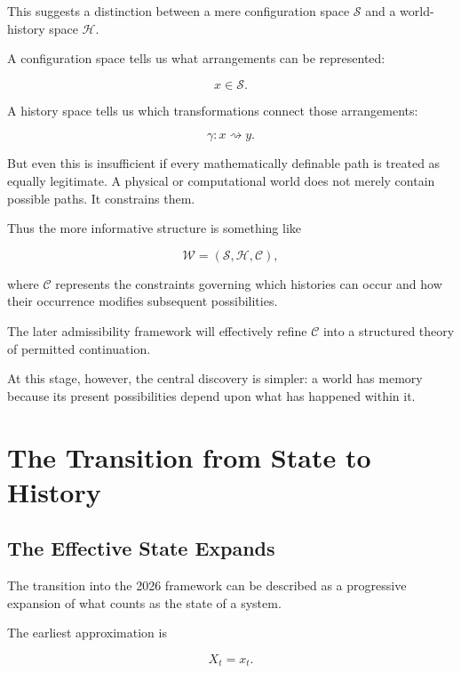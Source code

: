 \documentclass[11pt]{article}
\theoremstyle{remark}
\newcommand{\Hist}{\mathcal{H}}
\newcommand{\State}{\mathcal{S}}
\begin{document}
This suggests a distinction between a mere configuration space $\State$ and a world-history space $\Hist$.

A configuration space tells us what arrangements can be represented:

\begin{equation}
x \in \State.
\end{equation}

A history space tells us which transformations connect those arrangements:

\begin{equation}
\gamma : x \rightsquigarrow y.
\end{equation}

But even this is insufficient if every mathematically definable path is treated as equally legitimate. A physical or computational world does not merely contain possible paths. It constrains them.

Thus the more informative structure is something like

\begin{equation}
\mathcal{W}
=
(\State,\Hist,\mathcal{C}),
\end{equation}

where $\mathcal{C}$ represents the constraints governing which histories can occur and how their occurrence modifies subsequent possibilities.

The later admissibility framework will effectively refine $\mathcal{C}$ into a structured theory of permitted continuation.

At this stage, however, the central discovery is simpler: a world has memory because its present possibilities depend upon what has happened within it.

\section{The Transition from State to History}

\subsection{The Effective State Expands}

The transition into the 2026 framework can be described as a progressive expansion of what counts as the state of a system.

The earliest approximation is

\begin{equation}
X_t = x_t.
\end{equation}
\end{document}

